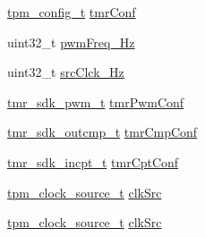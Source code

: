\begin{DoxyCompactItemize}
\item 
\mbox{\hyperlink{group__tpm_ga5647039a18486c876df5cdeb84c9621d}{tpm\+\_\+config\+\_\+t}} \mbox{\hyperlink{group__struct__group_gae9c2d4ddfa00c67ee5c396ce0a58b3c1}{tmr\+Conf}}
\item 
uint32\+\_\+t \mbox{\hyperlink{group__struct__group_ga04fed66246fbbc2d216a8afda24a758e}{pwm\+Freq\+\_\+\+Hz}}
\item 
uint32\+\_\+t \mbox{\hyperlink{group__struct__group_ga4386243efbc69e706d1811c2e66da6fc}{src\+Clck\+\_\+\+Hz}}
\item 
\mbox{\hyperlink{structtmr__sdk__pwm__t}{tmr\+\_\+sdk\+\_\+pwm\+\_\+t}} \mbox{\hyperlink{group__struct__group_ga8f16a276a8bcee2785e8db1cb8fed1d1}{tmr\+Pwm\+Conf}}
\item 
\mbox{\hyperlink{structtmr__sdk__outcmp__t}{tmr\+\_\+sdk\+\_\+outcmp\+\_\+t}} \mbox{\hyperlink{group__struct__group_ga5f9747758e13d1d50209440d3132a87e}{tmr\+Cmp\+Conf}}
\item 
\mbox{\hyperlink{structtmr__sdk__incpt__t}{tmr\+\_\+sdk\+\_\+incpt\+\_\+t}} \mbox{\hyperlink{group__struct__group_gad49fb6a9677fd308941ceb2302f67468}{tmr\+Cpt\+Conf}}
\item 
\mbox{\hyperlink{group__tpm_gac9f0f29f5ff0e39eea892919dc9b50d8}{tpm\+\_\+clock\+\_\+source\+\_\+t}} \mbox{\hyperlink{group__struct__group_gae714239d1fabd3df000d89beb931051a}{clk\+Src}}
\item 
\mbox{\hyperlink{group__tpm_gac9f0f29f5ff0e39eea892919dc9b50d8}{tpm\+\_\+clock\+\_\+source\+\_\+t}} \mbox{\hyperlink{group__struct__group_gae714239d1fabd3df000d89beb931051a}{clk\+Src}}
\end{DoxyCompactItemize}
